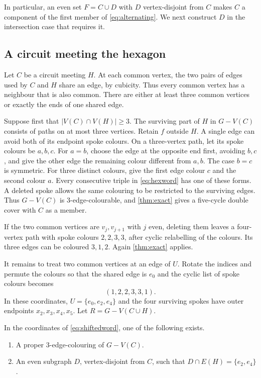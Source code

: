 \documentclass[justified,notoc,twoside,nobib,nofonts]{tufte-handout}
\begin{document}
In particular, an even set $F=C\cup D$ with $D$ vertex-disjoint from
$C$ makes $C$ a component of the first member of \eqref{eq:alternating}.
We next construct $D$ in the intersection case that requires it.

\subsection{A circuit meeting the hexagon}

Let $C$ be a circuit meeting $H$. At each common vertex, the two pairs
of edges used by $C$ and $H$ share an edge, by cubicity. Thus every
common vertex has a neighbour that is also common. There are either
at least three common vertices or exactly the ends of one shared edge.

Suppose first that $|V(C)\cap V(H)|\geq3$. The surviving part of $H$
in $G-V(C)$ consists of paths on at most three vertices. Retain $f$
outside $H$. A single edge can avoid both of its endpoint spoke
colours. On a three-vertex path, let its spoke colours be $a,b,c$.
For $a=b$, choose the edge at the opposite end first, avoiding $b,c$,
and give the other edge the remaining colour different from $a,b$.
The case $b=c$ is symmetric. For three distinct colours, give the
first edge colour $c$ and the second colour $a$. Every consecutive
triple in \eqref{eq:hexword} has one of these forms. A deleted spoke
allows the same colouring to be restricted to the surviving edges.
Thus $G-V(C)$ is 3-edge-colourable, and \cref{thm:exact} gives a
five-cycle double cover with $C$ as a member.

If the two common vertices are $v_j,v_{j+1}$ with $j$ even, deleting
them leaves a four-vertex path with spoke colours $2,2,3,3$, after
cyclic relabelling of the colours. Its three edges can be coloured
$3,1,2$. Again \cref{thm:exact} applies.

It remains to treat two common vertices at an edge of $U$. Rotate
the indices and permute the colours so that the shared edge is $e_0$
and the cyclic list of spoke colours becomes
\begin{equation}\label{eq:shiftedword}
  (1,2,2,3,3,1).
\end{equation}
In these coordinates, $U=\{e_0,e_2,e_4\}$ and the four surviving
spokes have outer endpoints $x_2,x_3,x_4,x_5$. Let
$R=G-V(C\cup H)$.

\begin{lemma}\label{lem:fourterm}
In the coordinates of \eqref{eq:shiftedword}, one of the following
exists.
\begin{enumerate}
\item A proper 3-edge-colouring of $G-V(C)$.
\item An even subgraph $D$, vertex-disjoint from $C$, such that
$D\cap E(H)=\{e_2,e_4\}$.
\end{enumerate}
\end{lemma}
\end{document}
